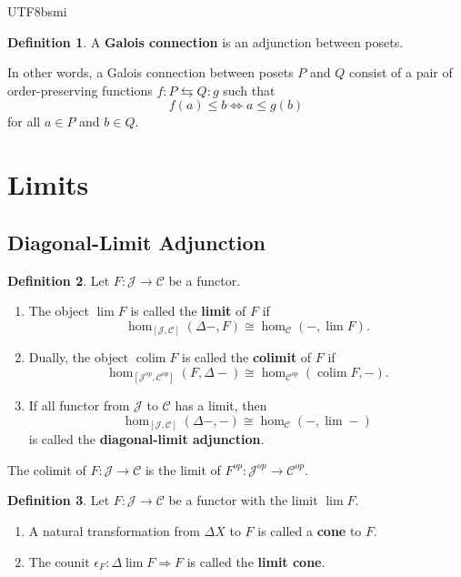 \documentclass[12pt]{article}
\theoremstyle{definition}
\newtheorem{definition}{Definition}[section]
\newcommand\<{\langle}
\renewcommand\>{\rangle}
\DeclareMathOperator{\colim}{colim}
\begin{document}
\begin{CJK}{UTF8}{bsmi}
\begin{definition}
    A \textbf{Galois connection} is an adjunction between posets.
\end{definition}

In other words, a Galois connection between posets $P$ and $Q$ consist of a pair of order-preserving functions $f:P\leftrightarrows Q:g$ such that
\[
    f(a) \le b \iff a \le g(b)
\]
for all $a\in P$ and $b\in Q$.

\section{Limits}

\subsection{Diagonal-Limit Adjunction}

\begin{definition}
    Let $F:\mathcal{J}\to\mathcal{C}$ be a functor.
    \begin{enumerate}
        \item The object $\lim F$ is called the \textbf{limit} of $F$ if
        \[
            \hom_{[\mathcal{J}, \mathcal{C}]}(\Delta-, F) \cong \hom_\mathcal{C}(-, \lim F).
        \]
        \item Dually, the object $\colim F$ is called the \textbf{colimit} of $F$ if
        \[
            \hom_{[\mathcal{J}^{op}, \mathcal{C}^{op}]}(F, \Delta-) \cong \hom_{\mathcal{C}^{op}}(\colim F, -).
        \]
    \item If all functor from $\mathcal{J}$ to $\mathcal{C}$ has a limit, then
        \[
            \hom_{[\mathcal{J}, \mathcal{C}]}(\Delta-, -) \cong \hom_\mathcal{C}(-, \lim -)
        \]
        is called the \textbf{diagonal-limit adjunction}.
    \end{enumerate}
\end{definition}

The colimit of $F:\mathcal{J}\to\mathcal{C}$ is the limit of $F^{op}:\mathcal{J}^{op}\to\mathcal{C}^{op}$.

\begin{definition}
    Let $F:\mathcal{J}\to\mathcal{C}$ be a functor with the limit $\lim F$.
    \begin{enumerate}
        \item A natural transformation from $\Delta X$ to $F$ is called a \textbf{cone} to $F$.
        \item The counit $\epsilon_F:\Delta\lim F\Rightarrow F$ is called the \textbf{limit cone}.
    \end{enumerate}
\end{definition}


\end{CJK}
\end{document}
